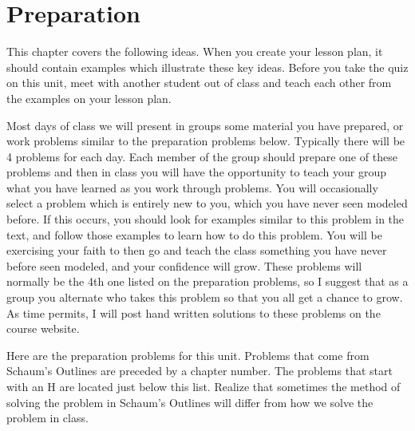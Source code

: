 \section{Preparation}

\noindent 
This chapter covers the following ideas. When you create your lesson plan, it should contain examples which illustrate these key ideas. Before you take the quiz on this unit, meet with another student out of class and teach each other from the examples on your lesson plan. 






Most days of class we will present in groups some material you have prepared, or work problems similar to the preparation problems below. Typically there will be 4 problems for each day. Each member of the group should prepare one of these problems and then in class you will have the opportunity to teach your group what you have learned as you work through problems. You will occasionally select a problem which is entirely new to you, which you have never seen modeled before. If this occurs, you should look for examples similar to this problem in the text, and follow those examples to learn how to do this problem. You will be exercising your faith to then go and teach the class something you have never before seen modeled, and your confidence will grow. These problems will normally be the 4th one listed on the preparation problems, so I suggest that as a group you alternate who takes this problem so that you all get a chance to grow. As time permits, I will post hand written solutions to these problems on the course website.  


Here are the preparation problems for this unit.  Problems that come from Schaum's Outlines are preceded by a chapter number. The problems that start with an H are located just below this list.   Realize that sometimes the method of solving the problem in Schaum's Outlines will differ from how we solve the problem in class. 




